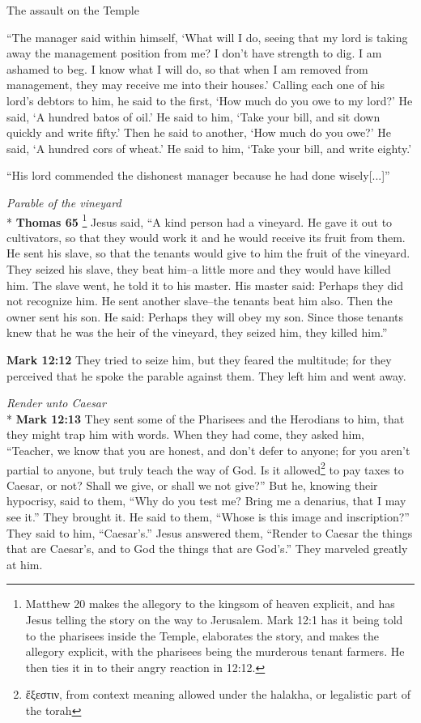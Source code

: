 \documentclass[10pt,a5paper,twoside]{article}
\newcommand{\quotesize}{\normalsize{}}
\newenvironment{quotetext}{\begingroup\quotesize}{\endgroup}
\newcommand{\intex}[1]{\index[texts]{#1}}
\newcommand{\bible}[2]{\begin{quotetext}\textbf{#1}\intex{#1} #2\end{quotetext}}
\newcommand{\gospelmark}[2]{\bible{Mark #1}{#2}}
\newcommand{\thomas}[2]{\bible{Thomas #1}{#2}}
\newcommand{\subhead}[1]{\emph{#1}\\*}
\begin{document}
\begin{section}{The assault on the Temple}
{   ``The manager said within himself, `What will I do, seeing that my lord is taking away the management position from me? I don't have strength to dig. I am ashamed to beg.    I know what I will do, so that when I am removed from management, they may receive me into their houses.'    Calling each one of his lord's debtors to him, he said to the first, `How much do you owe to my lord?'    He said, `A hundred batos of oil.' He said to him, `Take your bill, and sit down quickly and write fifty.'    Then he said to another, `How much do you owe?' He said, `A hundred cors of wheat.' He said to him, `Take your bill, and write eighty.'

   ``His lord commended the dishonest manager because he had done wisely[...]''
}

\subhead{Parable of the vineyard}
\thomas{65}{\footnote{Matthew 20 makes the allegory to the kingsom of heaven explicit, and has Jesus telling the story on the way to Jerusalem.
Mark 12:1 has it being told to the pharisees inside the Temple, 
elaborates the story, and makes the allegory explicit, with the pharisees being the murderous tenant farmers.
He then ties it in to their angry reaction in 12:12.}
Jesus said, ``A kind person had a vineyard. He gave it out to cultivators, so that
they would work it and he would receive its fruit from them. He sent
his slave, so that the tenants would give to him the fruit of the
vineyard. They seized his slave, they beat him--a little more and they
would have killed him. The slave went, he told it to his master. His
master said: Perhaps they did not recognize him. He sent another
slave--the tenants beat him also. Then the owner sent his son. He
said: Perhaps they will obey my son. Since those tenants knew that he
was the heir of the vineyard, they seized him, they killed
him.''
}

\gospelmark{12:12}{
 They tried to seize him, but they feared the multitude; for they perceived that he spoke the parable against them.
They left him and went away.
}

\subhead{Render unto Caesar}
\gospelmark{12:13}{
They sent some of the Pharisees and the Herodians to him, that they might trap him with words.   When they had come, they asked him, ``Teacher, we know that you are honest, and don't defer to anyone; for you aren't partial to anyone, but truly teach the way of God. Is it 
allowed\footnote{ἔξεστιν, from context meaning allowed under the halakha, or legalistic part of the torah}
 to pay taxes to Caesar, or not?   Shall we give, or shall we not give?''
But he, knowing their hypocrisy, said to them, ``Why do you test me? Bring me a denarius, that I may see it.''
  They brought it.
He said to them, ``Whose is this image and inscription?''
They said to him, ``Caesar's.''
  Jesus answered them, ``Render to Caesar the things that are Caesar's, and to God the things that are God's.''
They marveled greatly at him. 
}


\end{section}
\end{document}
